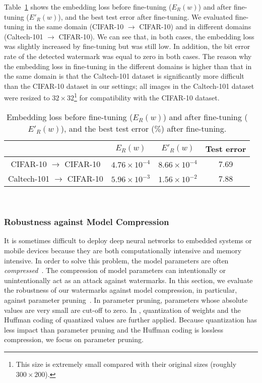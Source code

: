 \documentclass[10pt,twocolumn,letterpaper]{article}
\begin{document}
Table~\ref{tab:robust_finetune} shows the embedding loss before fine-tuning ($E_R (w)$) and after fine-tuning ($E'_R (w)$), and the best test error after fine-tuning.
We evaluated fine-tuning in the same domain (CIFAR-10 $\rightarrow$ CIFAR-10) and in different domains (Caltech-101 $\rightarrow$ CIFAR-10).
We can see that, in both cases, the embedding loss was slightly increased by fine-tuning but was still low.
In addition, the bit error rate of the detected watermark was equal to zero in both cases.
The reason why the embedding loss in fine-tuning in the different domains is higher than that in the same domain is that the Caltech-101 dataset is significantly more difficult than the CIFAR-10 dataset in our settings; all images in the Caltech-101 dataset were resized to $32 \times 32$\footnote{This size is extremely small compared with their original sizes (roughly $300 \times 200$).} for compatibility with the CIFAR-10 dataset.



\begin{table}[tb]
	\centering
	\small
	\caption{Embedding loss before fine-tuning ($E_R (w)$) and after fine-tuning ($E'_R (w)$), and the best test error ($\%$) after fine-tuning.}
	\label{tab:robust_finetune}
\begin{tabular}{c|ccc} \hline
					& $E_R (w)$				& $E'_R (w)$			& Test error	\\ \hline
CIFAR-10 $\rightarrow$ CIFAR-10	& $4.76{\times}10^{-4}$	& $8.66{\times}10^{-4}$	& 7.69	\\
Caltech-101 $\rightarrow$ CIFAR-10	& $5.96{\times}10^{-3}$	& $1.56{\times}10^{-2}$	& 7.88	\\ \hline
	\end{tabular} \\
\end{table}


\subsubsection{Robustness against Model Compression}
It is sometimes difficult to deploy deep neural networks to embedded systems or mobile devices because they are both computationally intensive and memory intensive.
In order to solve this problem, the model parameters are often \textit{compressed}~\cite{han_nips15, han_isca16, han_iclr16}.
The compression of model parameters can intentionally or unintentionally act as an attack against watermarks.
In this section, we evaluate the robustness of our watermarks against model compression, in particular, against parameter pruning~\cite{han_nips15}.
In parameter pruning, parameters whose absolute values are very small are cut-off to zero.
In \cite{han_iclr16}, quantization of weights and the Huffman coding of quantized values are further applied.
Because quantization has less impact than parameter pruning and the Huffman coding is lossless compression, we focus on parameter pruning.
\end{document}
